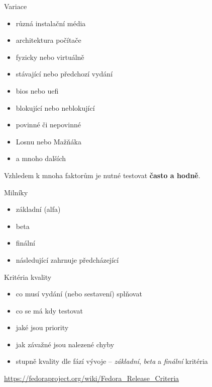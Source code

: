 \documentclass[12pt,aspectratio=169]{beamer}
\begin{document}
\begin{frame}{Variace}
	
	\begin{itemize}
		\item různá instalační média
		\item architektura počítače
		\item fyzicky nebo virtuálně
		\item stávající nebo předchozí vydání
		\item bios nebo uefi
		\item blokující nebo neblokující
		\item povinné či nepovinné
		\item Losnu nebo Mažňáka
		\item a mnoho dalších
	\end{itemize}

\vspace{10pt}

Vzhledem k mnoha faktorům je nutné testovat \textbf{často a hodně}. 
\end{frame}

\begin{frame}{Milníky}
	\begin{itemize}
	\item základní (alfa)
	\item beta
	\item finální
	\item následující zahrnuje předcházející
\end{itemize}
\end{frame}

\begin{frame}{Kritéria kvality}
	
	\begin{itemize}
		\item co musí vydání (nebo sestavení) splňovat
		\item co se má kdy testovat
		\item jaké jsou priority
		\item jak závažné jsou nalezené chyby
		\item stupně kvality dle fází vývoje -- \textit{základní}, \textit{beta} a \textit{finální} kritéria
	\end{itemize}
	
	\vspace{10pt}
	
	{\small \url{https://fedoraproject.org/wiki/Fedora_Release_Criteria}}
\end{frame}
\end{document}
